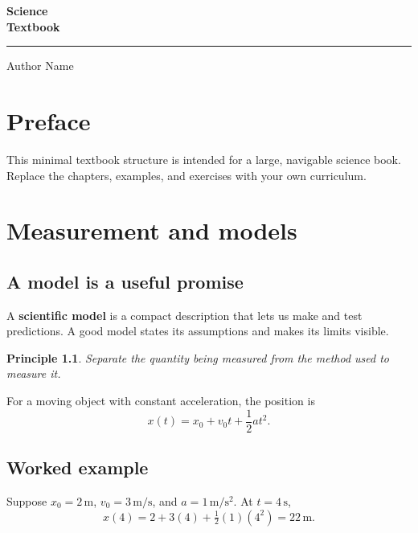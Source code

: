 \documentclass[11pt,oneside]{book}
\newcommand{\booksubtitle}{A practical science textbook starter}
\newcommand{\keyterm}[1]{\textbf{\color{scienceblue}#1}\index{#1}}
\newtheorem{principle}{Principle}[chapter]
\begin{document}
\begin{titlepage}
\centering
\vspace*{1.0in}
{\fontsize{34}{40}\selectfont\bfseries Science\\Textbook\par}
\vspace{14pt}\rule{0.75\textwidth}{3pt}\par
\vspace{18pt}{\Large\booksubtitle\par}
\vfill
{\Large Author Name\par}\vspace{6pt}{\large Department or School\par}
\end{titlepage}
\chapter*{Preface}
This minimal textbook structure is intended for a large, navigable science
book. Replace the chapters, examples, and exercises with your own curriculum.
\tableofcontents
\mainmatter
\chapter{Measurement and models}
\section{A model is a useful promise}
A \keyterm{scientific model} is a compact description that lets us make and
test predictions. A good model states its assumptions and makes its limits
visible.
\begin{principle}
Separate the quantity being measured from the method used to measure it.
\end{principle}
For a moving object with constant acceleration, the position is
\begin{equation}
  x(t)=x_0+v_0t+\frac{1}{2}at^2.
\end{equation}
\section{Worked example}
Suppose $x_0=2\,\mathrm{m}$, $v_0=3\,\mathrm{m/s}$, and
$a=1\,\mathrm{m/s^2}$. At $t=4\,\mathrm{s}$,
\begin{equation*}
  x(4)=2+3(4)+\tfrac12(1)(4^2)=22\,\mathrm{m}.
\end{equation*}
\end{document}
